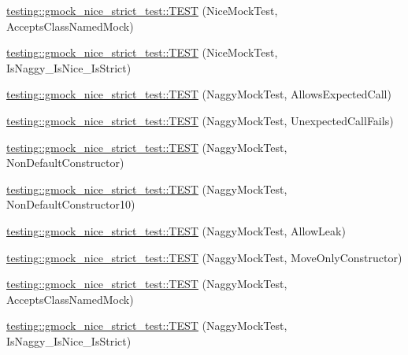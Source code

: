 \begin{DoxyCompactItemize}
\item 
\mbox{\hyperlink{namespacetesting_1_1gmock__nice__strict__test_a0a43059a52437e547c8fb836008b8e60}{testing\+::gmock\+\_\+nice\+\_\+strict\+\_\+test\+::\+T\+E\+ST}} (Nice\+Mock\+Test, Accepts\+Class\+Named\+Mock)
\item 
\mbox{\hyperlink{namespacetesting_1_1gmock__nice__strict__test_a94dd6c20e30f88457f7d9a583881be5a}{testing\+::gmock\+\_\+nice\+\_\+strict\+\_\+test\+::\+T\+E\+ST}} (Nice\+Mock\+Test, Is\+Naggy\+\_\+\+Is\+Nice\+\_\+\+Is\+Strict)
\item 
\mbox{\hyperlink{namespacetesting_1_1gmock__nice__strict__test_a8ae416186af77fc0d066467be92c6c86}{testing\+::gmock\+\_\+nice\+\_\+strict\+\_\+test\+::\+T\+E\+ST}} (Naggy\+Mock\+Test, Allows\+Expected\+Call)
\item 
\mbox{\hyperlink{namespacetesting_1_1gmock__nice__strict__test_a475ee57b7b86f3f81d50819db3dd78b4}{testing\+::gmock\+\_\+nice\+\_\+strict\+\_\+test\+::\+T\+E\+ST}} (Naggy\+Mock\+Test, Unexpected\+Call\+Fails)
\item 
\mbox{\hyperlink{namespacetesting_1_1gmock__nice__strict__test_a9618de98b38e8e4270873d9b2616e3e1}{testing\+::gmock\+\_\+nice\+\_\+strict\+\_\+test\+::\+T\+E\+ST}} (Naggy\+Mock\+Test, Non\+Default\+Constructor)
\item 
\mbox{\hyperlink{namespacetesting_1_1gmock__nice__strict__test_a982de09f3040cc5b9f457a7aa4e00652}{testing\+::gmock\+\_\+nice\+\_\+strict\+\_\+test\+::\+T\+E\+ST}} (Naggy\+Mock\+Test, Non\+Default\+Constructor10)
\item 
\mbox{\hyperlink{namespacetesting_1_1gmock__nice__strict__test_abafc38649114354a5dc342524ca2102e}{testing\+::gmock\+\_\+nice\+\_\+strict\+\_\+test\+::\+T\+E\+ST}} (Naggy\+Mock\+Test, Allow\+Leak)
\item 
\mbox{\hyperlink{namespacetesting_1_1gmock__nice__strict__test_adffb618d5dacd53e35c05b2f16b91710}{testing\+::gmock\+\_\+nice\+\_\+strict\+\_\+test\+::\+T\+E\+ST}} (Naggy\+Mock\+Test, Move\+Only\+Constructor)
\item 
\mbox{\hyperlink{namespacetesting_1_1gmock__nice__strict__test_af147980581baec3cf492457c2d1e0276}{testing\+::gmock\+\_\+nice\+\_\+strict\+\_\+test\+::\+T\+E\+ST}} (Naggy\+Mock\+Test, Accepts\+Class\+Named\+Mock)
\item 
\mbox{\hyperlink{namespacetesting_1_1gmock__nice__strict__test_a59d1c771bd39f8c3831688a235a193e7}{testing\+::gmock\+\_\+nice\+\_\+strict\+\_\+test\+::\+T\+E\+ST}} (Naggy\+Mock\+Test, Is\+Naggy\+\_\+\+Is\+Nice\+\_\+\+Is\+Strict)
\item 

\end{DoxyCompactItemize}
